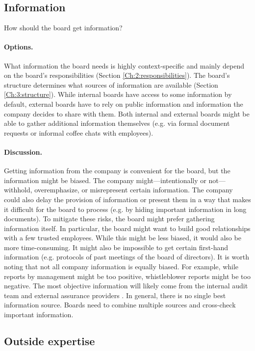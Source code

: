 \documentclass{article}
\begin{document}
\subsection{Information}\label{Ch:6:2:information}

How should the board get information?

\paragraph{Options.} What information the board needs is highly context-specific and mainly depend on the board’s responsibilities (Section \ref{Ch:2:responsibilities}). The board’s structure determines what sources of information are available (Section \ref{Ch:3:structure}). While internal boards have access to some information by default, external boards have to rely on public information and information the company decides to share with them. Both internal and external boards might be able to gather additional information themselves (e.g. via formal document requests or informal coffee chats with employees).

\paragraph{Discussion.} Getting information from the company is convenient for the board, but the information might be biased. The company might—intentionally or not—withhold, overemphasize, or misrepresent certain information. The company could also delay the provision of information or present them in a way that makes it difficult for the board to process (e.g. by hiding important information in long documents). To mitigate these risks, the board might prefer gathering information itself. In particular, the board might want to build good relationships with a few trusted employees. While this might be less biased, it would also be more time-consuming. It might also be impossible to get certain first-hand information (e.g. protocols of past meetings of the board of directors). It is worth noting that not all company information is equally biased. For example, while reports by management might be too positive, whistleblower reports might be too negative. The most objective information will likely come from the internal audit team and external assurance providers \cite{schuett2022lines}. In general, there is no single best information source. Boards need to combine multiple sources and cross-check important information.

\subsection{Outside expertise}\label{Ch:6:3:expertise}
\end{document}
